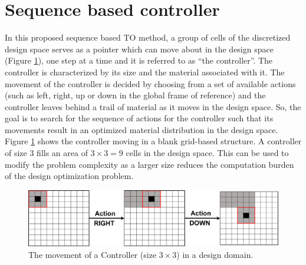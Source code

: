 \section{Sequence based controller}
\label{section:MDP_Sequence_based_controller}

In this proposed sequence based TO method, a group of cells of the discretized design space serves as a pointer which can move about in the design space (Figure \ref{fig:MDP_controller_movement}), one step at a time and it is referred to as “the controller”. The controller is characterized by its size and the material associated with it. The movement of the controller is decided by choosing from a set of available actions (such as left, right, up or down in the global frame of reference) and the controller leaves behind a trail of material as it moves in the design space. So, the goal is to search for the sequence of actions for the controller such that its movements result in an optimized material distribution in the design space. Figure \ref{fig:MDP_controller_movement} shows the controller moving in a blank grid-based structure. A controller of size 3 fills an area of $3 \times 3 = 9$ cells in the design space. This can be used to modify the problem complexity as a larger size reduces the computation burden of the design optimization problem.

\begin{figure}[h!]
    \centering
    \includegraphics[width=\textwidth]{Figures/Ch_MDP/MDP_movement_final_2.png}
    \caption{The movement of a Controller (size $3 \times 3$) in a design domain.}
    \label{fig:MDP_controller_movement}
\end{figure}

